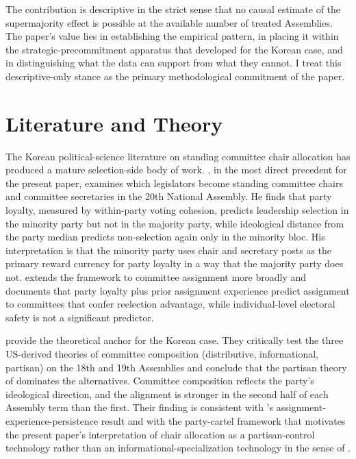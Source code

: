 \documentclass[11pt]{article}
\begin{document}
The contribution is descriptive in the strict sense that no causal estimate of the supermajority effect is possible at the available number of treated Assemblies. The paper's value lies in establishing the empirical pattern, in placing it within the strategic-precommitment apparatus that \citet{jeong2023} developed for the Korean case, and in distinguishing what the data can support from what they cannot. I treat this descriptive-only stance as the primary methodological commitment of the paper.

\section{Literature and Theory}

The Korean political-science literature on standing committee chair allocation has produced a mature selection-side body of work. \citet{kang2023}, in the most direct precedent for the present paper, examines which legislators become standing committee chairs and committee secretaries in the 20th National Assembly. He finds that party loyalty, measured by within-party voting cohesion, predicts leadership selection in the minority party but not in the majority party, while ideological distance from the party median predicts non-selection again only in the minority bloc. His interpretation is that the minority party uses chair and secretary posts as the primary reward currency for party loyalty in a way that the majority party does not. \citet{kang2024} extends the framework to committee assignment more broadly and documents that party loyalty plus prior assignment experience predict assignment to committees that confer reelection advantage, while individual-level electoral safety is not a significant predictor.

\citet{choikoo2018} provide the theoretical anchor for the Korean case. They critically test the three US-derived theories of committee composition (distributive, informational, partisan) on the 18th and 19th Assemblies and conclude that the partisan theory of \citet[ch.~1-3]{coxmccubbins2005} dominates the alternatives. Committee composition reflects the party's ideological direction, and the alignment is stronger in the second half of each Assembly term than the first. Their finding is consistent with \citet{kang2024}'s assignment-experience-persistence result and with the party-cartel framework that motivates the present paper's interpretation of chair allocation as a partisan-control technology rather than an informational-specialization technology in the sense of \citet{gilligankrehbiel1987}.
\end{document}
